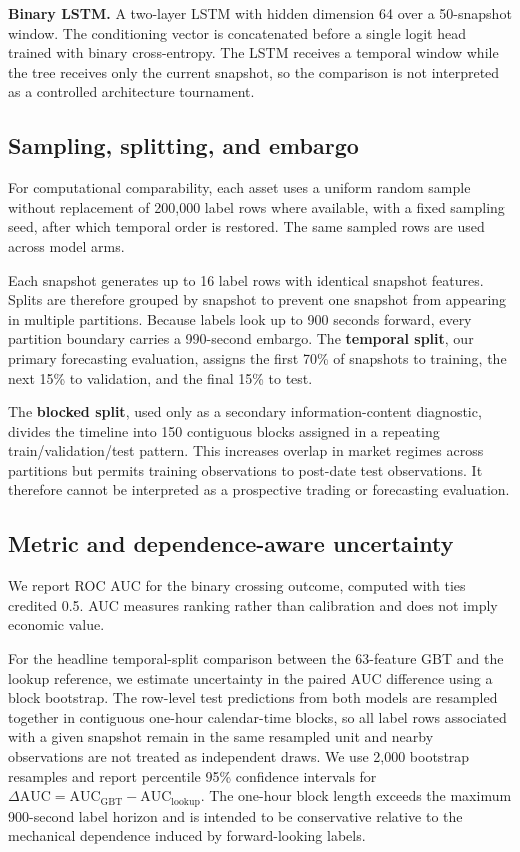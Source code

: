 \documentclass[11pt]{article}
\begin{document}
\textbf{Binary LSTM.} A two-layer LSTM with hidden dimension 64 over a 50-snapshot window. The conditioning vector is concatenated before a single logit head trained with binary cross-entropy. The LSTM receives a temporal window while the tree receives only the current snapshot, so the comparison is not interpreted as a controlled architecture tournament.

\subsection{Sampling, splitting, and embargo}
For computational comparability, each asset uses a uniform random sample without replacement of 200,000 label rows where available, with a fixed sampling seed, after which temporal order is restored. The same sampled rows are used across model arms.

Each snapshot generates up to 16 label rows with identical snapshot features. Splits are therefore grouped by snapshot to prevent one snapshot from appearing in multiple partitions. Because labels look up to 900 seconds forward, every partition boundary carries a 990-second embargo. The \textbf{temporal split}, our primary forecasting evaluation, assigns the first 70\% of snapshots to training, the next 15\% to validation, and the final 15\% to test.

The \textbf{blocked split}, used only as a secondary information-content diagnostic, divides the timeline into 150 contiguous blocks assigned in a repeating train/validation/test pattern. This increases overlap in market regimes across partitions but permits training observations to post-date test observations. It therefore cannot be interpreted as a prospective trading or forecasting evaluation.

\subsection{Metric and dependence-aware uncertainty}
We report ROC AUC for the binary crossing outcome, computed with ties credited 0.5. AUC measures ranking rather than calibration and does not imply economic value.

For the headline temporal-split comparison between the 63-feature GBT and the lookup reference, we estimate uncertainty in the paired AUC difference using a block bootstrap. The row-level test predictions from both models are resampled together in contiguous one-hour calendar-time blocks, so all label rows associated with a given snapshot remain in the same resampled unit and nearby observations are not treated as independent draws. We use 2,000 bootstrap resamples and report percentile 95\% confidence intervals for $\Delta\mathrm{AUC}=\mathrm{AUC}_{\mathrm{GBT}}-\mathrm{AUC}_{\mathrm{lookup}}$. The one-hour block length exceeds the maximum 900-second label horizon and is intended to be conservative relative to the mechanical dependence induced by forward-looking labels.
\end{document}
